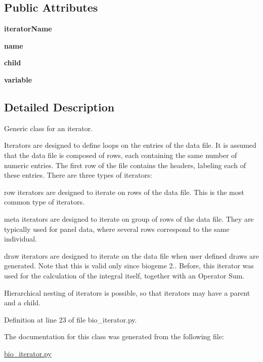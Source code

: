 \subsection*{Public Attributes}
\begin{DoxyCompactItemize}
\item 
{\bfseries iterator\+Name}\hypertarget{classbio__iterator_1_1iterator_a10e4188d8459b5342d609df5a1267a5d}{}\label{classbio__iterator_1_1iterator_a10e4188d8459b5342d609df5a1267a5d}

\item 
{\bfseries name}\hypertarget{classbio__iterator_1_1iterator_a0dbadbe5cc949e2bfa25591b22956989}{}\label{classbio__iterator_1_1iterator_a0dbadbe5cc949e2bfa25591b22956989}

\item 
{\bfseries child}\hypertarget{classbio__iterator_1_1iterator_a67a5a5a22ba01bcaa168c9e056eb25d0}{}\label{classbio__iterator_1_1iterator_a67a5a5a22ba01bcaa168c9e056eb25d0}

\item 
{\bfseries variable}\hypertarget{classbio__iterator_1_1iterator_a2fd1e60735f344291efbbbf0fbf8a48a}{}\label{classbio__iterator_1_1iterator_a2fd1e60735f344291efbbbf0fbf8a48a}

\end{DoxyCompactItemize}


\subsection{Detailed Description}
Generic class for an iterator. 

Iterators are designed to define loops on the entries of the data file. It is assumed that the data file is composed of rows, each containing the same number of numeric entries. The first row of the file contains the headers, labeling each of these entries. There are three types of iterators\+:
\begin{DoxyItemize}
\item row iterators are designed to iterate on rows of the data file. This is the most common type of iterators.
\item meta iterators are designed to iterate on group of rows of the data file. They are typically used for panel data, where several rows correspond to the same individual.
\item draw iterators are designed to iterate on the data file when user defined draws are generated. Note that this is valid only since biogeme 2.. Before, this iterator was used for the calculation of the integral itself, together with an Operator Sum.
\end{DoxyItemize}

Hierarchical nesting of iterators is possible, so that iterators may have a parent and a child. 

Definition at line 23 of file bio\+\_\+iterator.\+py.



The documentation for this class was generated from the following file\+:\begin{DoxyCompactItemize}
\item 
\hyperlink{bio__iterator_8py}{bio\+\_\+iterator.\+py}\end{DoxyCompactItemize}
